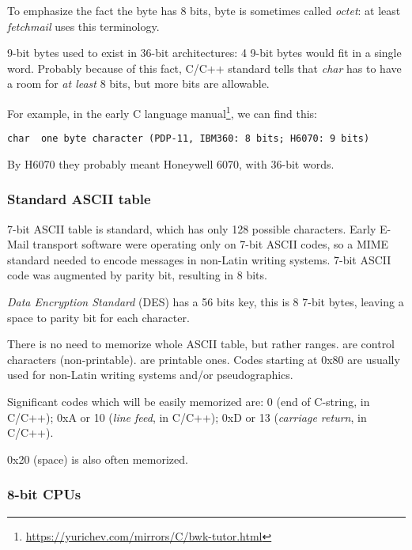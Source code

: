 To emphasize the fact the byte has 8 bits, byte is sometimes called \emph{octet}:
at least \emph{fetchmail} uses this terminology.

9-bit bytes used to exist in 36-bit architectures: 4 9-bit bytes would fit in a single \gls{word}.
Probably because of this fact, C/C++ standard tells that \emph{char} has to have a room for \emph{at least} 8 bits, but more
bits are allowable.

For example, in the early C language manual\footnote{\url{https://yurichev.com/mirrors/C/bwk-tutor.html}}, we can find this:

\begin{lstlisting}
char  one byte character (PDP-11, IBM360: 8 bits; H6070: 9 bits)
\end{lstlisting}

By H6070 they probably meant Honeywell 6070, with 36-bit words.

\subsubsection{Standard ASCII table}

7-bit ASCII table is standard, which has only 128 possible characters.
Early E-Mail transport software were operating only on 7-bit ASCII codes, so a \ac{MIME} standard needed to encode messages
in non-Latin writing systems.
7-bit ASCII code was augmented by parity bit, resulting in 8 bits.

\emph{Data Encryption Standard} (\ac{DES}) has a 56 bits key, this is 8 7-bit bytes,
leaving a space to parity bit for each character.

There is no need to memorize whole \ac{ASCII} table, but rather ranges.
 are control characters (non-printable).
 are printable ones.
Codes starting at 0x80 are usually used for non-Latin writing systems and/or pseudographics.

Significant codes which will be easily memorized are:
0 (end of C-string,  in C/C++);
0xA or 10 (\emph{line feed},  in C/C++);
0xD or 13 (\emph{carriage return},  in C/C++).

0x20 (space) is also often memorized.

\subsubsection{8-bit CPUs}

